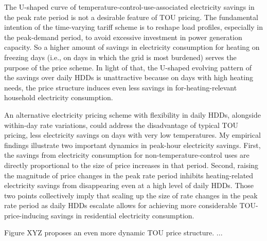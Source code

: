 The U-shaped curve of temperature-control-use-associated electricity savings in the peak rate period is not a desirable feature of TOU pricing. The fundamental intention of the time-varying tariff scheme is to reshape load profiles, especially in the peak-demand period, to avoid excessive investment in power generation capacity. So a higher amount of savings in electricity consumption for heating on freezing days (i.e., on days in which the grid is most burdened) serves the purpose of the price scheme. In light of that, the U-shaped evolving pattern of the savings over daily HDDs is unattractive because on days with high heating needs, the price structure induces even less savings in for-heating-relevant household electricity consumption. 

An alternative electricity pricing scheme with flexibility in daily HDDs, alongside within-day rate variations, could address the disadvantage of typical TOU pricing, less electricity savings on days with very low temperatures. My empirical findings illustrate two important dynamics in peak-hour electricity savings. First, the savings from electricity consumption for non-temperature-control uses are directly proportional to the size of price increases in that period. Second, raising the magnitude of price changes in the peak rate period inhibits heating-related electricity savings from disappearing even at a high level of daily HDDs. Those two points collectively imply that scaling up the size of rate changes in the peak rate period as daily HDDs escalate allows for achieving more considerable TOU-price-inducing savings in residential electricity consumption.  
 
Figure XYZ proposes an even more dynamic TOU price structure. ... 

